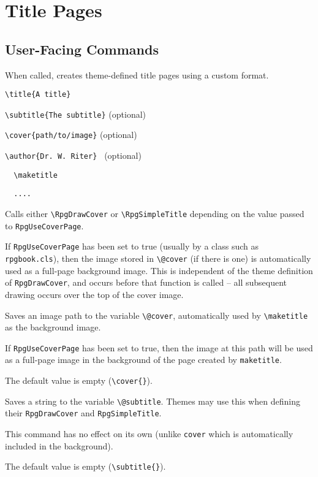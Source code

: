 	\section{Title Pages}
		\subsection{User-Facing Commands}
			\begin{macrolist}
				\RpgMacro*[maketitle]{\maketitle,{{}}}
					{	
						When called, creates theme-defined title pages using a custom format.
					}{
						\verb|\title{A title}|

						\verb|\subtitle{The subtitle}| (optional)
						
						\verb|\cover{path/to/image}| (optional)
						
						\verb|\author{Dr. W. Riter} | (optional)
						
						\verb||
						
						\verb|	\maketitle|
						
						\verb|	....|
						
						\verb||
					}{
						Calls either \verb|\RpgDrawCover| or \verb|\RpgSimpleTitle| depending on the value passed to \verb|RpgUseCoverPage|.

						If \verb|RpgUseCoverPage| has been set to true (usually by a class such as \verb|rpgbook.cls|), then the image stored in \verb|\@cover| (if there is one) is automatically used as a full-page background image. This is independent of the theme definition of \verb|RpgDrawCover|, and occurs before that function is called -- all subsequent drawing occurs over the top of the cover image.
					}
				{Saves an image path to the variable \verb|\@cover|, automatically used by \verb|\maketitle| as the background image.
					}
					{
					}
					{
						If \verb|RpgUseCoverPage| has been set to true, then the image at this path will be used as a full-page image in the background of the page created by \verb|maketitle|.

						The default value is empty (\verb|\cover{}|).
					}
					{
						Saves a string to the variable \verb|\@subtitle|. Themes may use this when defining their \verb|RpgDrawCover| and \verb|RpgSimpleTitle|.
					}
					{
						\subtitle{<string>}
					}
					{
						This command has no effect on its own (unlike \verb|cover| which is automatically included in the background).

						The default value is empty (\verb|\subtitle{}|).
					}
			\end{macrolist}
